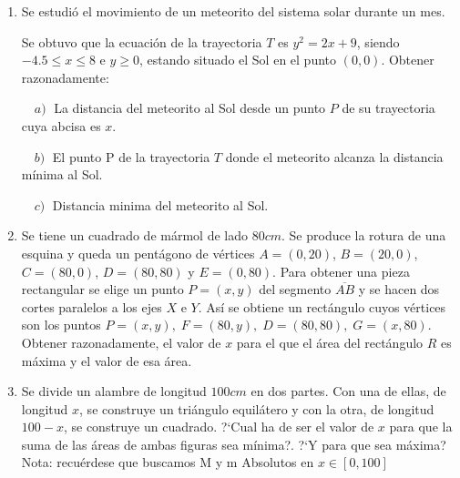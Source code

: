 \begin{enumerate}
		\item Se estudió el movimiento de un meteorito del sistema solar durante un mes. 
		
		
		Se obtuvo que la ecuación de la trayectoria $T$
		es $y^2=2x+9$, siendo $-4.5\le x \le 8$ e $y \ge 0$, estando situado el Sol en el punto $(0,0)$. Obtener razonadamente:
		
	$\quad a)\; $ La distancia del meteorito al Sol desde un punto $P$ de su trayectoria cuya abcisa es $x$.

	$\quad b)\; $ El punto P de la trayectoria $T$ donde el meteorito alcanza la distancia mínima al Sol. 
	
	$\quad c)\; $ Distancia minima del meteorito al Sol.

		
		
		\item Se tiene un cuadrado de mármol de lado $80 cm$. Se produce la rotura de una esquina y queda un pentágono de vértices $A = (0, 20)$, $B = (20, 0)$, $C = (80, 0)$, $D = (80, 80)$ y $E = (0, 80)$. Para obtener una pieza rectangular se elige un punto $P = (x , y)$ del segmento $\overline{AB}$ y se hacen dos cortes paralelos a los ejes $X$ e $Y$. Así se obtiene un rectángulo cuyos vértices son los puntos $P=(x,y),\; F=(80,y),\;  D=(80,80), \;  G=(x,80)$.
		Obtener razonadamente, el valor de $x$ para el que el área del rectángulo $R$ es máxima y el valor de esa área.
		
		\rightline{\textcolor{gris}{Solución: $x=10cm; \; A=4900cm^2$}}
		
		\item Se divide un alambre de longitud $100 cm$ en dos partes. Con una de ellas, de longitud $x$, se construye un triángulo equilátero y con la otra, de longitud $100 - x$, se construye un cuadrado. 
		?`Cual ha de ser el valor de $x$ para que la suma de las áreas de ambas figuras sea mínima?. ?`Y para que sea máxima? 
		\textcolor{gris}{Nota: recuérdese que buscamos M y m Absolutos en $x\in [0,100]$}
		
		\rightline{\textcolor{gris}{Solución: $x_m=56,5cm;\; A_m=182.4cm^2; \quad x_M=0cm; \; A_M=625$}}
		
		 \rightline{\textcolor{gris} {Para el máximo, todo el alambre se usa para construir un cuadrado de lado $25cm$}}
				
\end{enumerate}

